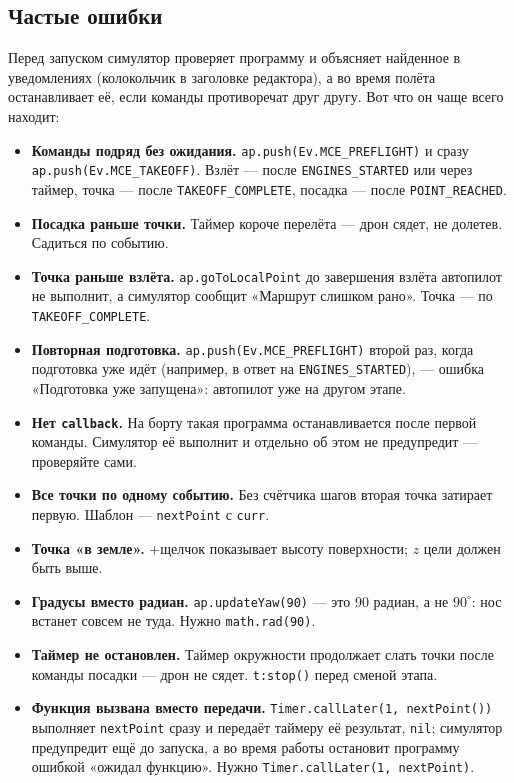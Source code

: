 \subsection{Частые ошибки}

Перед запуском симулятор проверяет программу и объясняет найденное в уведомлениях (колокольчик в заголовке редактора), а во время полёта останавливает её, если команды противоречат друг другу. Вот что он чаще всего находит:

\begin{itemize}
    \item \textbf{Команды подряд без ожидания.} \verb|ap.push(Ev.MCE_PREFLIGHT)| и сразу \verb|ap.push(Ev.MCE_TAKEOFF)|. Взлёт --- после \verb|ENGINES_STARTED| или через таймер, точка --- после \verb|TAKEOFF_COMPLETE|, посадка --- после \verb|POINT_REACHED|.
    \item \textbf{Посадка раньше точки.} Таймер короче перелёта --- дрон сядет, не долетев. Садиться по событию.
    \item \textbf{Точка раньше взлёта.} \verb|ap.goToLocalPoint| до завершения взлёта автопилот не выполнит, а симулятор сообщит «Маршрут слишком рано». Точка --- по \verb|TAKEOFF_COMPLETE|.
    \item \textbf{Повторная подготовка.} \verb|ap.push(Ev.MCE_PREFLIGHT)| второй раз, когда подготовка уже идёт (например, в ответ на \verb|ENGINES_STARTED|), --- ошибка «Подготовка уже запущена»: автопилот уже на другом этапе.
    \item \textbf{Нет \texttt{callback}.} На борту такая программа останавливается после первой команды. Симулятор её выполнит и отдельно об этом не предупредит --- проверяйте сами.
    \item \textbf{Все точки по одному событию.} Без счётчика шагов вторая точка затирает первую. Шаблон --- \verb|nextPoint| с \verb|curr|.
    \item \textbf{Точка «в земле».} +щелчок показывает высоту поверхности; $z$ цели должен быть выше.
    \item \textbf{Градусы вместо радиан.} \verb|ap.updateYaw(90)| --- это 90 радиан, а не $90^\circ$: нос встанет совсем не туда. Нужно \verb|math.rad(90)|.
    \item \textbf{Таймер не остановлен.} Таймер окружности продолжает слать точки после команды посадки --- дрон не сядет. \verb|t:stop()| перед сменой этапа.
    \item \textbf{Функция вызвана вместо передачи.} \texttt{Timer.callLater(1, nextPoint())} выполняет \verb|nextPoint| сразу и передаёт таймеру её результат, \verb|nil|; симулятор предупредит ещё до запуска, а во время работы остановит программу ошибкой «ожидал функцию». Нужно \verb|Timer.callLater(1, nextPoint)|.
\end{itemize}

